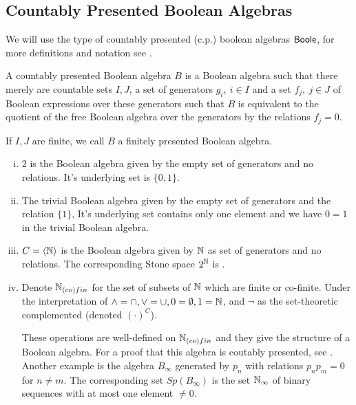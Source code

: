 \subsection{Countably Presented Boolean Algebras}
We will use the type of countably presented (c.p.) boolean algebras $\mathsf{Boole}$,
for more definitions and notation see .

\begin{definition}
  A countably presented Boolean algebra $B$ is a Boolean algebra such that there merely are 
  countable sets $I,J$, 
  a set of generators $g_i,~{i\in I}$ and a set $f_j,~{j\in J}$ of Boolean expressions over these generators 
  such that $B$ is equivalent to the quotient of the free Boolean algebra over the generators by the relations
  $f_j=0$. 
\end{definition} 
If $I,J$ are finite, we call $B$ a finitely presented Boolean algebra. 

\begin{example}
  \label{boolean-algebra-examples}
  \begin{enumerate}[(i)]
  \item $2$ is the Boolean algebra given by the empty set of generators and no relations. 
    It's underlying set is $\{0,1\}$. 
  \item   The trivial Boolean algebra given by the empty set of generators and the relation $\{1\}$, 
    It's underlying set contains only one element and we have $0=1$ in the trivial Boolean algebra. 
  \item\label{ExampleBAunderCantor}   $C = \langle \mathbb{N} \rangle $ is the Boolean algebra given by $\mathbb{N}$ as set of generators and no relations. The corresponding Stone space $2^{\mathbb{N}}$ is .
  \item\label{ExampleBAunderNinfty}
    Denote $\mathbb{N}_{(co)fin}$ for the set of subsets of $\mathbb{N}$ which are finite or co-finite. 
    Under the interpretation of $\wedge = \cap , \vee = \cup, 0 = \emptyset, 1 = \mathbb{N}$, and $\neg$ 
    as the set-theoretic complemented (denoted $(\cdot)^C$). 
    
    These operations are well-defined on $\mathbb{N}_{(co)fin}$ 
    and they give the structure of a Boolean algebra. For a proof that this algebra is coutably presented, see .
    Another example is the algebra $B_{\infty}$ generated by $p_n$ with relations $p_np_m = 0$ for $n\neq m$. The corresponding
set $Sp(B_{\infty})$ is the set $\mathbb{N}_{\infty}$ of binary sequences with at most one element $\neq 0$.

  \end{enumerate}
\end{example}

